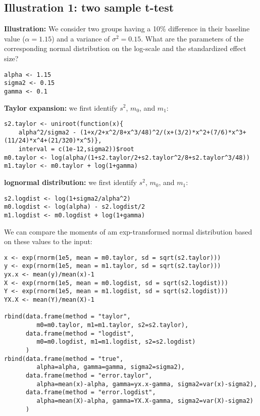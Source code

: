 \documentclass[12pt]{article}
\begin{document}
\clearpage

\subsection{Illustration 1: two sample t-test}
\label{sec:org68a502b}

\textbf{Illustration:} We consider two groups having a 10\% difference
in their baseline value (\(\alpha=1.15\)) and a variance of \(\sigma^2
= 0.15\). What are the parameters of the corresponding normal
distribution on the log-scale and the standardized effect size?
\lstset{language=r,label= ,caption= ,captionpos=b,numbers=none}
\begin{lstlisting}
alpha <- 1.15
sigma2 <- 0.15
gamma <- 0.1
\end{lstlisting}

\textbf{Taylor expansion:} we first identify \(s^2\), \(m_0\), and
\(m_1\):
\lstset{language=r,label= ,caption= ,captionpos=b,numbers=none}
\begin{lstlisting}
s2.taylor <- uniroot(function(x){
    alpha^2/sigma2 - (1+x/2+x^2/8+x^3/48)^2/(x+(3/2)*x^2+(7/6)*x^3+(11/24)*x^4+(21/320)*x^5)},
    interval = c(1e-12,sigma2))$root
m0.taylor <- log(alpha/(1+s2.taylor/2+s2.taylor^2/8+s2.taylor^3/48))
m1.taylor <- m0.taylor + log(1+gamma)
\end{lstlisting}

\textbf{lognormal distribution:} we first identify \(s^2\), \(m_0\),
and \(m_1\):
\lstset{language=r,label= ,caption= ,captionpos=b,numbers=none}
\begin{lstlisting}
s2.logdist <- log(1+sigma2/alpha^2)
m0.logdist <- log(alpha) - s2.logdist/2
m1.logdist <- m0.logdist + log(1+gamma)
\end{lstlisting}

We can compare the moments of am exp-transformed normal distribution
based on these values to the input:
\lstset{language=r,label= ,caption= ,captionpos=b,numbers=none}
\begin{lstlisting}
x <- exp(rnorm(1e5, mean = m0.taylor, sd = sqrt(s2.taylor)))
y <- exp(rnorm(1e5, mean = m1.taylor, sd = sqrt(s2.taylor)))
yx.x <- mean(y)/mean(x)-1
X <- exp(rnorm(1e5, mean = m0.logdist, sd = sqrt(s2.logdist)))
Y <- exp(rnorm(1e5, mean = m1.logdist, sd = sqrt(s2.logdist)))
YX.X <- mean(Y)/mean(X)-1

rbind(data.frame(method = "taylor", 
		 m0=m0.taylor, m1=m1.taylor, s2=s2.taylor), 
      data.frame(method = "logdist", 
		 m0=m0.logdist, m1=m1.logdist, s2=s2.logdist)
      )
rbind(data.frame(method = "true", 
		 alpha=alpha, gamma=gamma, sigma2=sigma2), 
      data.frame(method = "error.taylor", 
		 alpha=mean(x)-alpha, gamma=yx.x-gamma, sigma2=var(x)-sigma2),
      data.frame(method = "error.logdist", 
		 alpha=mean(X)-alpha, gamma=YX.X-gamma, sigma2=var(X)-sigma2)
      )
\end{lstlisting}
\end{document}
